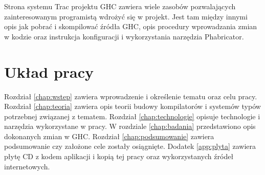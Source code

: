 Strona systemu Trac projektu GHC zawiera wiele zasobów pozwalających
zainteresowanym programistą wdrożyć się w projekt. Jest tam między innymi opis
jak pobrać i skompilować źródła GHC\cite{WikiNewcomers}, opis procedury
wprowadzania zmian w kodzie\cite{WikiFixingBugs} oraz instrukcja konfiguracji i
wykorzystania narzędzia Phabricator\cite{WikiPhabricator}.


\section{Układ pracy}\label{sec:uklad_pracy}

Rozdział \ref{chap:wstep} zawiera wprowadzenie i określenie tematu oraz celu
pracy. Rozdział \ref{chap:teoria} zawiera opis teorii budowy kompilatorów i
systemów typów potrzebnej związanej z tematem. Rozdział \ref{chap:technologie}
opisuje technologie i narzędzia wykorzystane w pracy. W rozdziale
\ref{chap:badania} przedstawiono opis dokonanych zmian w GHC. Rozdział
\ref{chap:podsumowanie} zawiera podsumowanie czy założone cele zostały
osiągnięte. Dodatek \ref{app:plyta} zawiera płytę CD z kodem aplikacji i kopią tej pracy oraz
wykorzystanych źródeł internetowych.

